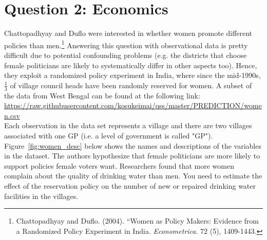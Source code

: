 \documentclass[12pt,letterpaper]{article}
\begin{document}
\section*{Question 2: Economics}
Chattopadhyay and Duflo were interested in whether women promote different policies than men.\footnote{Chattopadhyay and Duflo. (2004). ``Women as Policy Makers: Evidence from a Randomized Policy Experiment in India. \textit{Econometrica}. 72 (5), 1409-1443.} Answering this question with observational data is pretty difficult due to potential confounding problems (e.g. the districts that choose female politicians are likely to systematically differ in other aspects too). Hence, they exploit a randomized policy experiment in India, where since the mid-1990s, $\frac{1}{3}$ of village council heads have been randomly reserved for women. A subset of the data from West Bengal can be found at the following link: \url{https://raw.githubusercontent.com/kosukeimai/qss/master/PREDICTION/women.csv}\\

\noindent Each observation in the data set represents a village and there are two villages associated with one GP (i.e. a level of government is called "GP"). Figure~\ref{fig:women_desc} below shows the names and descriptions of the variables in the dataset. The authors hypothesize that female politicians are more likely to support policies female voters want. Researchers found that more women complain about the quality of drinking water than men. You need to estimate the effect of the reservation policy on the number of new or repaired drinking water facilities in the villages.
\vspace{.5cm}	
\end{document}
